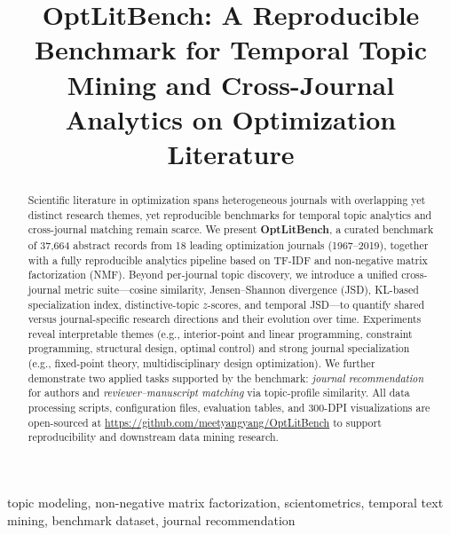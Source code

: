 \documentclass[conference]{IEEEtran}
\newcommand{\repo}{\url{https://github.com/meetyangyang/OptLitBench}}
\begin{document}
\title{OptLitBench: A Reproducible Benchmark for Temporal Topic Mining and Cross-Journal Analytics on Optimization Literature}

\author{
}

\maketitle

\begin{abstract}
Scientific literature in optimization spans heterogeneous journals with overlapping yet distinct research themes, yet reproducible benchmarks for temporal topic analytics and cross-journal matching remain scarce.
We present \textbf{OptLitBench}, a curated benchmark of 37,664 abstract records from 18 leading optimization journals (1967--2019), together with a fully reproducible analytics pipeline based on TF-IDF and non-negative matrix factorization (NMF).
Beyond per-journal topic discovery, we introduce a unified cross-journal metric suite---cosine similarity, Jensen--Shannon divergence (JSD), KL-based specialization index, distinctive-topic $z$-scores, and temporal JSD---to quantify shared versus journal-specific research directions and their evolution over time.
Experiments reveal interpretable themes (e.g., interior-point and linear programming, constraint programming, structural design, optimal control) and strong journal specialization (e.g., fixed-point theory, multidisciplinary design optimization).
We further demonstrate two applied tasks supported by the benchmark: \emph{journal recommendation} for authors and \emph{reviewer--manuscript matching} via topic-profile similarity.
All data processing scripts, configuration files, evaluation tables, and 300-DPI visualizations are open-sourced at \repo{} to support reproducibility and downstream data mining research.
\end{abstract}

\begin{IEEEkeywords}
topic modeling, non-negative matrix factorization, scientometrics, temporal text mining, benchmark dataset, journal recommendation
\end{IEEEkeywords}
\end{document}
